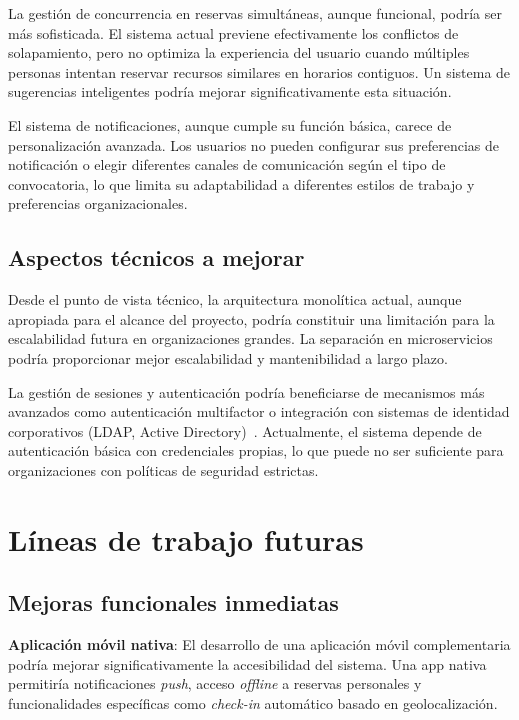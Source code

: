 La gestión de concurrencia en reservas simultáneas, aunque funcional, podría ser más sofisticada. El sistema actual previene efectivamente los conflictos de solapamiento, pero no optimiza la experiencia del usuario cuando múltiples personas intentan reservar recursos similares en horarios contiguos. Un sistema de sugerencias inteligentes podría mejorar significativamente esta situación.

El sistema de notificaciones, aunque cumple su función básica, carece de personalización avanzada. Los usuarios no pueden configurar sus preferencias de notificación o elegir diferentes canales de comunicación según el tipo de convocatoria, lo que limita su adaptabilidad a diferentes estilos de trabajo y preferencias organizacionales.

\subsection{Aspectos técnicos a mejorar}\label{aspectos-tecnicos-mejorar}
Desde el punto de vista técnico, la arquitectura monolítica actual, aunque apropiada para el alcance del proyecto, podría constituir una limitación para la escalabilidad futura en organizaciones grandes. La separación en microservicios podría proporcionar mejor escalabilidad y mantenibilidad a largo plazo.

La gestión de sesiones y autenticación podría beneficiarse de mecanismos más avanzados como autenticación multifactor o integración con sistemas de identidad corporativos (LDAP, Active Directory)~\cite{ldap-active-directory}. Actualmente, el sistema depende de autenticación básica con credenciales propias, lo que puede no ser suficiente para organizaciones con políticas de seguridad estrictas.

\section{Líneas de trabajo futuras}\label{lineas-trabajo-futuras}
\subsection{Mejoras funcionales inmediatas}\label{mejoras-funcionales-inmediatas}
\textbf{Aplicación móvil nativa}: El desarrollo de una aplicación móvil complementaria podría mejorar significativamente la accesibilidad del sistema. Una app nativa permitiría notificaciones \emph{push}, acceso \emph{offline} a reservas personales y funcionalidades específicas como \emph{check-in} automático basado en geolocalización.

